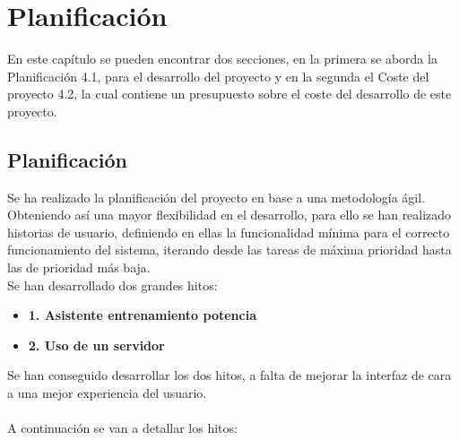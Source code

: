 \chapter{Planificación}

En este capítulo se pueden encontrar dos secciones, en la primera se aborda la Planificación 4.1, para el desarrollo del proyecto y en la segunda el Coste del proyecto 4.2, la cual contiene un presupuesto sobre el coste del desarrollo de este proyecto.

\section{Planificación}

Se ha realizado la planificación del proyecto en base a una metodología ágil. Obteniendo así una mayor flexibilidad en el desarrollo, para ello se han realizado historias de usuario, definiendo en ellas la funcionalidad mínima para el correcto funcionamiento del sistema, iterando desde las tareas de máxima prioridad hasta las de prioridad más baja.
\\
Se han desarrollado dos grandes hitos:
\begin{itemize}
\setlength\itemsep{0pt}
    \item \textbf{1. Asistente entrenamiento potencia}
    \item  \textbf{2. Uso de un servidor}
\end{itemize}
\noindent
Se han conseguido desarrollar los dos hitos, a falta de mejorar la interfaz de cara a una mejor experiencia del usuario. %
\\
\\
A continuación se van a detallar los hitos:
